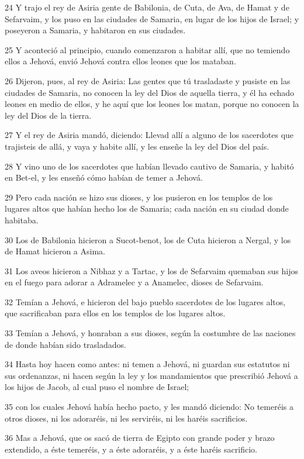 \par 24 Y trajo el rey de Asiria gente de Babilonia, de Cuta, de Ava, de Hamat y de Sefarvaim, y los puso en las ciudades de Samaria, en lugar de los hijos de Israel; y poseyeron a Samaria, y habitaron en sus ciudades.
\par 25 Y aconteció al principio, cuando comenzaron a habitar allí, que no temiendo ellos a Jehová, envió Jehová contra ellos leones que los mataban.
\par 26 Dijeron, pues, al rey de Asiria: Las gentes que tú trasladaste y pusiste en las ciudades de Samaria, no conocen la ley del Dios de aquella tierra, y él ha echado leones en medio de ellos, y he aquí que los leones los matan, porque no conocen la ley del Dios de la tierra.
\par 27 Y el rey de Asiria mandó, diciendo: Llevad allí a alguno de los sacerdotes que trajisteis de allá, y vaya y habite allí, y les enseñe la ley del Dios del país.
\par 28 Y vino uno de los sacerdotes que habían llevado cautivo de Samaria, y habitó en Bet-el, y les enseñó cómo habían de temer a Jehová.
\par 29 Pero cada nación se hizo sus dioses, y los pusieron en los templos de los lugares altos que habían hecho los de Samaria; cada nación en su ciudad donde habitaba.
\par 30 Los de Babilonia hicieron a Sucot-benot, los de Cuta hicieron a Nergal, y los de Hamat hicieron a Asima.
\par 31 Los aveos hicieron a Nibhaz y a Tartac, y los de Sefarvaim quemaban sus hijos en el fuego para adorar a Adramelec y a Anamelec, dioses de Sefarvaim.
\par 32 Temían a Jehová, e hicieron del bajo pueblo sacerdotes de los lugares altos, que sacrificaban para ellos en los templos de los lugares altos.
\par 33 Temían a Jehová, y honraban a sus dioses, según la costumbre de las naciones de donde habían sido trasladados.
\par 34 Hasta hoy hacen como antes: ni temen a Jehová, ni guardan sus estatutos ni sus ordenanzas, ni hacen según la ley y los mandamientos que prescribió Jehová a los hijos de Jacob, al cual puso el nombre de Israel; 
\par 35 con los cuales Jehová había hecho pacto, y les mandó diciendo: No temeréis a otros dioses, ni los adoraréis, ni les serviréis, ni les haréis sacrificios. 
\par 36 Mas a Jehová, que os sacó de tierra de Egipto con grande poder y brazo extendido, a éste temeréis, y a éste adoraréis, y a éste haréis sacrificio.
